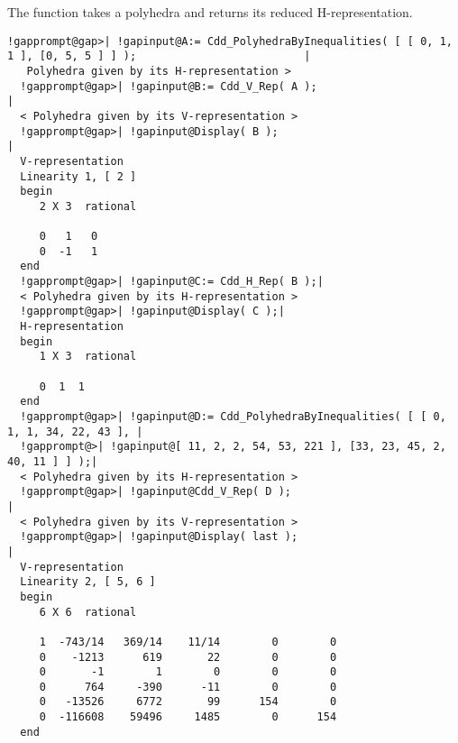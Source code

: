 \documentclass[a4paper,11pt]{report}
\begin{document}
{{{ The function takes a polyhedra and returns its reduced H-representation. }

 
\begin{Verbatim}[commandchars=!@|,fontsize=\small,frame=single,label=Example]
  !gapprompt@gap>| !gapinput@A:= Cdd_PolyhedraByInequalities( [ [ 0, 1, 1 ], [0, 5, 5 ] ] );                          |
   Polyhedra given by its H-representation >
  !gapprompt@gap>| !gapinput@B:= Cdd_V_Rep( A );                                    |
  < Polyhedra given by its V-representation >
  !gapprompt@gap>| !gapinput@Display( B );                                   |
  V-representation 
  Linearity 1, [ 2 ]
  begin 
     2 X 3  rational
                
     0   1   0 
     0  -1   1 
  end
  !gapprompt@gap>| !gapinput@C:= Cdd_H_Rep( B );|
  < Polyhedra given by its H-representation >
  !gapprompt@gap>| !gapinput@Display( C );|
  H-representation 
  begin 
     1 X 3  rational
              
     0  1  1 
  end
  !gapprompt@gap>| !gapinput@D:= Cdd_PolyhedraByInequalities( [ [ 0, 1, 1, 34, 22, 43 ], |
  !gapprompt@>| !gapinput@[ 11, 2, 2, 54, 53, 221 ], [33, 23, 45, 2, 40, 11 ] ] );|
  < Polyhedra given by its H-representation >
  !gapprompt@gap>| !gapinput@Cdd_V_Rep( D );                                                                                                     |
  < Polyhedra given by its V-representation >
  !gapprompt@gap>| !gapinput@Display( last );                                                                                                    |
  V-representation 
  Linearity 2, [ 5, 6 ]
  begin 
     6 X 6  rational
                                                          
     1  -743/14   369/14    11/14        0        0 
     0    -1213      619       22        0        0 
     0       -1        1        0        0        0 
     0      764     -390      -11        0        0 
     0   -13526     6772       99      154        0 
     0  -116608    59496     1485        0      154 
  end
\end{Verbatim}
 }

 }

   
\end{document}
